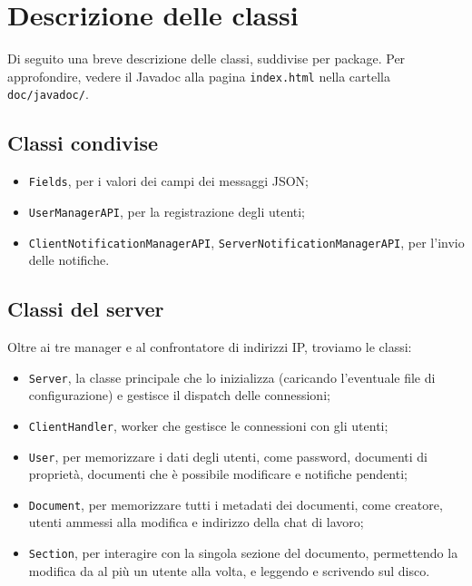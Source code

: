 \section{Descrizione delle classi}
Di seguito una breve descrizione delle classi, suddivise per package. Per approfondire, vedere il Javadoc alla pagina \texttt{index.html} nella cartella \texttt{doc/javadoc/}.

\subsection{Classi condivise}
\begin{itemize}
	\item \texttt{Fields}, per i valori dei campi dei messaggi JSON;
	\item \texttt{UserManagerAPI}, per la registrazione degli utenti;
	\item \texttt{ClientNotificationManagerAPI}, \texttt{ServerNotificationManagerAPI}, per l'invio delle notifiche.
\end{itemize}

\subsection{Classi del server}
Oltre ai tre manager e al confrontatore di indirizzi IP, troviamo le classi:
\begin{itemize}
	\item \texttt{Server}, la classe principale che lo inizializza (caricando l'eventuale file di configurazione) e gestisce il dispatch delle connessioni;
	\item \texttt{ClientHandler}, worker che gestisce le connessioni con gli utenti;
	\item \texttt{User}, per memorizzare i dati degli utenti, come password, documenti di proprietà, documenti che è possibile modificare e notifiche pendenti;
	\item \texttt{Document}, per memorizzare tutti i metadati dei documenti, come creatore, utenti ammessi alla modifica e indirizzo della chat di lavoro;
	\item \texttt{Section}, per interagire con la singola sezione del documento, permettendo la modifica da al più un utente alla volta, e leggendo e scrivendo sul disco.
\end{itemize}

